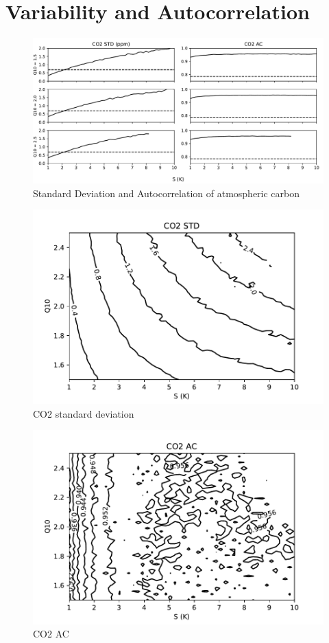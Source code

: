 \section{Variability and Autocorrelation}
\begin{figure}
  \centering
  \includegraphics[width=\textwidth]{co2_std_ac}
  \caption[Atmospheric Carbon Variability]{Standard Deviation and Autocorrelation of atmospheric carbon}
  \label{fig:co2_std_ac}
  \end{figure}
  \begin{figure}
  \centering
  \includegraphics{co2stdcontour}
  \caption{CO2 standard deviation}
  \label{fig:co2_std_Q10_S}
\end{figure}
\begin{figure}
  \centering
  \includegraphics{co2accontour}
  \caption{CO2 AC}
  \label{fig:co2_ac_Q10_S}
\end{figure}
